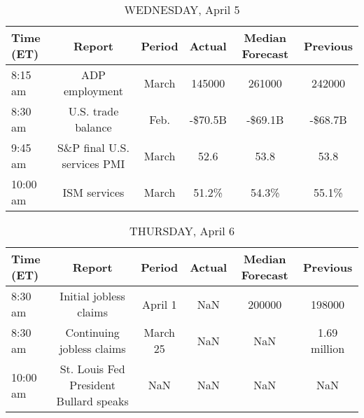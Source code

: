 \documentclass{article}%
\begin{document}
\begin{table}[htbp]%
\caption{WEDNESDAY, April 5}%
\centering%
\begin{adjustbox}{width=1\textwidth}%
\begin{tabular}{lccccc}
\toprule
Time (ET) &                      Report & Period &  Actual & Median Forecast & Previous \\
\midrule
  8:15 am &              ADP employment &  March &  145000 &          261000 &   242000 \\
  8:30 am &          U.S. trade balance &   Feb. & -\$70.5B &         -\$69.1B &  -\$68.7B \\
  9:45 am & S\&P final U.S. services PMI &  March &    52.6 &            53.8 &     53.8 \\
 10:00 am &                ISM services &  March &   51.2\% &           54.3\% &    55.1\% \\
\bottomrule
\end{tabular}
%
\end{adjustbox}%
\end{table}

%


\begin{table}[htbp]%
\caption{THURSDAY, April 6}%
\centering%
\begin{adjustbox}{width=1\textwidth}%
\begin{tabular}{lccccc}
\toprule
Time (ET) &                                 Report &   Period & Actual & Median Forecast &     Previous \\
\midrule
  8:30 am &                 Initial jobless claims &  April 1 &    NaN &          200000 &       198000 \\
  8:30 am &              Continuing jobless claims & March 25 &    NaN &             NaN & 1.69 million \\
 10:00 am & St. Louis Fed President Bullard speaks &      NaN &    NaN &             NaN &          NaN \\
\bottomrule
\end{tabular}
%
\end{adjustbox}%
\end{table}

%
\end{document}
